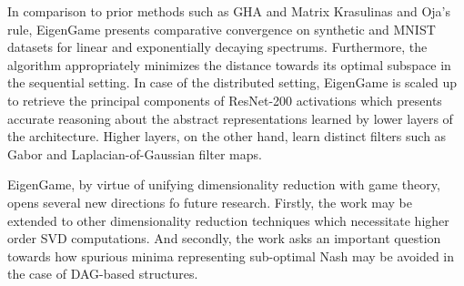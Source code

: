 \documentclass[11pt,letterpaper]{article}
\begin{document}
In comparison to prior methods such as GHA and Matrix Krasulinas and Oja's rule, EigenGame presents comparative convergence on synthetic and MNIST datasets for linear and exponentially decaying spectrums. Furthermore, the algorithm appropriately minimizes the distance towards its optimal subspace in the sequential setting. In case of the distributed setting, EigenGame is scaled up to retrieve the principal components of ResNet-200 activations which presents accurate reasoning about the abstract representations learned by lower layers of the architecture. Higher layers, on the other hand, learn distinct filters such as Gabor and Laplacian-of-Gaussian filter maps. 

EigenGame, by virtue of unifying dimensionality reduction with game theory, opens several new directions fo future research. Firstly, the work may be extended to other dimensionality reduction techniques which necessitate higher order SVD computations. And secondly, the work asks an important question towards how spurious minima representing sub-optimal Nash may be avoided in the case of DAG-based structures.
\end{document}
